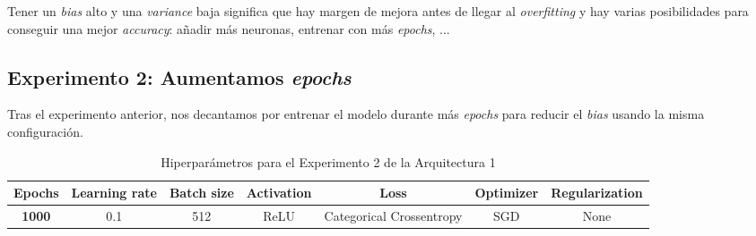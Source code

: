 \documentclass{article}
\begin{document}
			Tener un \textit{bias} alto y una \textit{variance} baja significa que hay margen de mejora antes de llegar al \textit{overfitting} y hay varias posibilidades para conseguir una mejor \textit{accuracy}: a\~nadir m\'as neuronas, entrenar con m\'as \textit{epochs}, ...
		
		\subsection{Experimento 2: Aumentamos \textit{epochs}}
		\label{s-a1-e2}
			Tras el experimento anterior, nos decantamos por entrenar el modelo durante m\'as \textit{epochs} para reducir el \textit{bias} usando la misma configuraci\'on.\\
			\begin{table}[!h]
				\begin{center}
					\begin{tabular}{| c | c | c | c | c | c | c |}
						\textbf{Epochs} & \textbf{Learning rate} & \textbf{Batch size} & \textbf{Activation} & \textbf{Loss} & \textbf{Optimizer} & \textbf{Regularization} \\ \hline
						\textbf{1000} & 0.1 & 512 & ReLU & Categorical Crossentropy & SGD & None
					\end{tabular}
					\caption{Hiperpar\'ametros para el Experimento 2 de la Arquitectura 1}
					\label{tab:hip-a1-e2}
				\end{center}
			\end{table}
			
\end{document}

